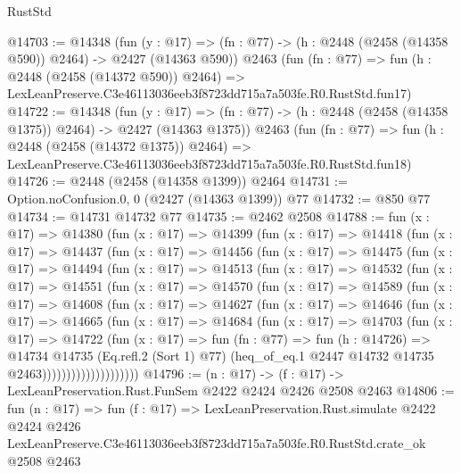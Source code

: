 \begin{lexlean}{RustStd}
\begin{coremodule}
@14703 := @14348
    (fun (y : @17) => (fn : @77) -> (h : @2448 (@2458 (@14358 @590)) @2464) -> @2427 (@14363 @590))
    @2463
    (fun (fn : @77) =>
    fun (h : @2448 (@2458 (@14372 @590)) @2464) =>
    LexLeanPreserve.C3e46113036eeb3f8723dd715a7a503fe.R0.RustStd.fun17)
@14722 := @14348
    (fun (y : @17) =>
    (fn : @77) -> (h : @2448 (@2458 (@14358 @1375)) @2464) -> @2427 (@14363 @1375))
    @2463
    (fun (fn : @77) =>
    fun (h : @2448 (@2458 (@14372 @1375)) @2464) =>
    LexLeanPreserve.C3e46113036eeb3f8723dd715a7a503fe.R0.RustStd.fun18)
@14726 := @2448 (@2458 (@14358 @1399)) @2464
@14731 := Option.noConfusion.{0, 0} (@2427 (@14363 @1399)) @77
@14732 := @850 @77
@14734 := @14731 @14732 @77
@14735 := @2462 @2508
@14788 := fun (x : @17) =>
  @14380
    (fun (x : @17) =>
    @14399
      (fun (x : @17) =>
      @14418
        (fun (x : @17) =>
        @14437
          (fun (x : @17) =>
          @14456
            (fun (x : @17) =>
            @14475
              (fun (x : @17) =>
              @14494
                (fun (x : @17) =>
                @14513
                  (fun (x : @17) =>
                  @14532
                    (fun (x : @17) =>
                    @14551
                      (fun (x : @17) =>
                      @14570
                        (fun (x : @17) =>
                        @14589
                          (fun (x : @17) =>
                          @14608
                            (fun (x : @17) =>
                            @14627
                              (fun (x : @17) =>
                              @14646
                                (fun (x : @17) =>
                                @14665
                                  (fun (x : @17) =>
                                  @14684
                                    (fun (x : @17) =>
                                    @14703
                                      (fun (x : @17) =>
                                      @14722
                                        (fun (x : @17) =>
                                        fun (fn : @77) =>
                                        fun (h : @14726) =>
                                        @14734
                                          @14735
                                          (Eq.refl.{2} (Sort 1) @77)
                                          (heq_of_eq.{1}
                                            @2447
                                            @14732
                                            @14735
                                            @2463))))))))))))))))))))
@14796 := (n : @17) -> (f : @17) -> LexLeanPreservation.Rust.FunSem @2422 @2424 @2426 @2508 @2463
@14806 := fun (n : @17) =>
  fun (f : @17) =>
  LexLeanPreservation.Rust.simulate
    @2422
    @2424
    @2426
    LexLeanPreserve.C3e46113036eeb3f8723dd715a7a503fe.R0.RustStd.crate_ok
    @2508
    @2463
\end{coremodule}
\end{lexlean}
